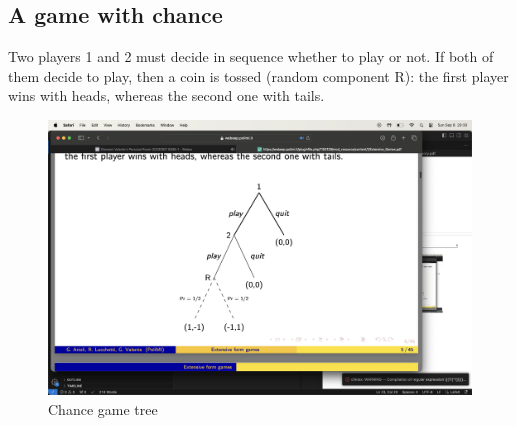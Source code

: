 \subsection{A game with chance}
Two players 1 and 2 must decide in sequence whether to play or not.
If both of them decide to play, then a coin is tossed (random component R): the first player wins with heads, whereas the second one with tails.
\begin{figure}[H]
    \centering
    \includegraphics[width=0.75\linewidth]{images/tree1.png}
    \caption{Chance game tree}
\end{figure}

